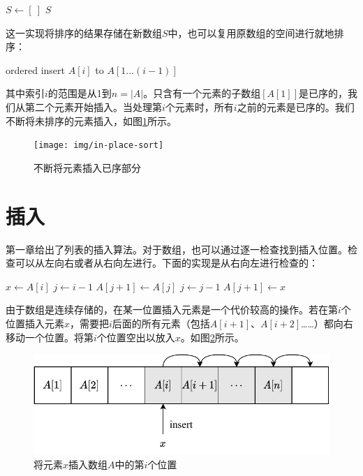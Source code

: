 \documentclass[b5paper]{ctexart}
\begin{document}
\begin{algorithmic}[1]
  \State $S \gets [\ ]$
    \State {}
  \EndFor
  \State \Return $S$
\EndFunction
\end{algorithmic}

这一实现将排序的结果存储在新数组$S$中，也可以复用原数组的空间进行就地排序：

\begin{algorithmic}[1]
    \State ordered insert $A[i]$ to $A[1...(i-1)]$
  \EndFor
\EndFunction
\end{algorithmic}

其中索引$i$的范围是从1到$n = |A|$。只含有一个元素的子数组$[A[1]]$是已序的，我们从第二个元素开始插入。当处理第$i$个元素时，所有$i$之前的元素是已序的。我们不断将未排序的元素插入，如图\cref{fig:in-place-isort}所示。

\begin{figure}[htbp]
  \centering
  \texttt{[image: img/in-place-sort]}
  \caption{不断将元素插入已序部分}
  \label{fig:in-place-isort}
\end{figure}

\section{插入}

第一章给出了列表的插入算法。对于数组，也可以通过逐一检查找到插入位置。检查可以从左向右或者从右向左进行。下面的实现是从右向左进行检查的：

\begin{algorithmic}[1]
    \State $x \gets A[i]$ 
    \State $j \gets i-1$
      \State $A[j+1] \gets A[j]$
      \State $j \gets j - 1$
    \EndWhile
    \State $A[j+1] \gets x$
  \EndFor
\EndFunction
\end{algorithmic}

由于数组是连续存储的，在某一位置插入元素是一个代价较高的操作。若在第$i$个位置插入元素$x$，需要把$i$后面的所有元素（包括$A[i+1]$、$A[i+2]$……）都向右移动一个位置。将第$i$个位置空出以放入$x$。如图\cref{fig:array-shift}所示。

\begin{figure}[htbp]
  \centering
  \includegraphics[scale=0.7]{img/array-shift}
  \caption{将元素$x$插入数组$A$中的第$i$个位置}
  \label{fig:array-shift}
\end{figure}
\end{document}
